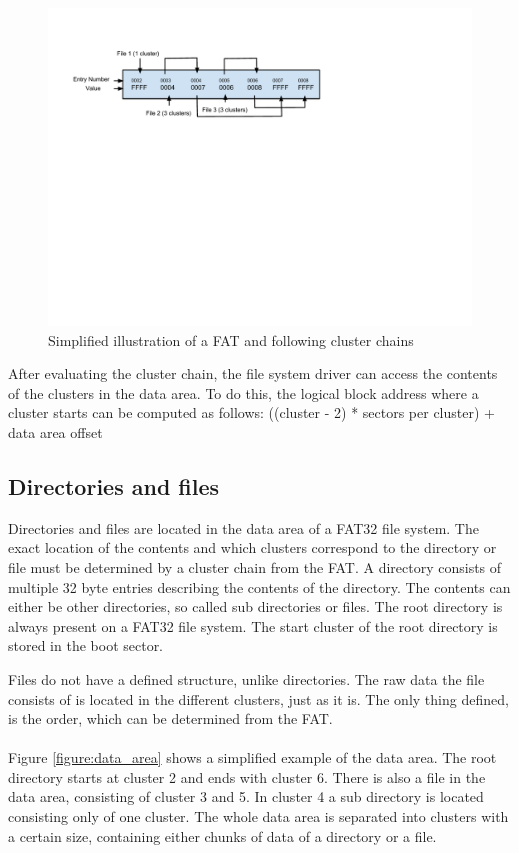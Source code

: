 \begin{figure}[h!]
\caption{Simplified illustration of a FAT and following cluster chains}
\centering
\includegraphics{figures/cluster_chain}
\end{figure}

After evaluating the cluster chain, the file system driver can access the contents of the clusters in the data area. To do this, the logical block address where a cluster starts can be computed as follows: ((cluster - 2) * sectors per cluster) + data area offset

\subsection{Directories and files}

Directories and files are located in the data area of a FAT32 file system. The exact location of the contents and which clusters correspond to the directory or file must be determined by a cluster chain from the FAT. A directory consists of multiple 32 byte entries describing the contents of the directory. The contents can either be other directories, so called sub directories or files. The root directory is always present on a FAT32 file system. The start cluster of the root directory is stored in the boot sector.

Files do not have a defined structure, unlike directories. The raw data the file consists of is located in the different clusters, just as it is. The only thing defined, is the order, which can be determined from the FAT.
\\\\
Figure \ref{figure:data_area} shows a simplified example of the data area. The root directory starts at cluster 2 and ends with cluster 6. There is also a file in the data area, consisting of cluster 3 and 5. In cluster 4 a sub directory is located consisting only of one cluster. The whole data area is separated into clusters with a certain size, containing either chunks of data of a directory or a file.

